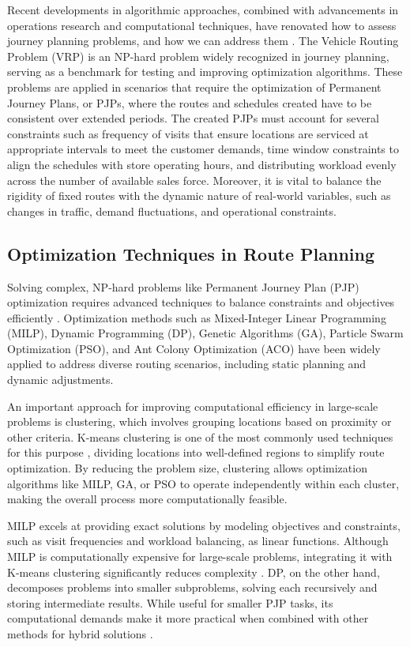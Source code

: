 Recent developments in algorithmic approaches, combined with advancements in operations research and computational techniques, have renovated how to assess journey planning problems, and how we can address them \cite{almaatani2014new}. The Vehicle Routing Problem (VRP) is an NP-hard problem widely recognized in journey planning, serving as a benchmark for testing and improving optimization algorithms. These problems are applied in scenarios that require the optimization of Permanent Journey Plans, or PJPs, where the routes and schedules created have to be consistent over extended periods. The created PJPs must account for several constraints such as frequency of visits that ensure locations are serviced at appropriate intervals to meet the customer demands, time window constraints to align the schedules with store operating hours, and distributing workload evenly across the number of available sales force. Moreover, it is vital to balance the rigidity of fixed routes with the dynamic nature of real-world variables, such as changes in traffic, demand fluctuations, and operational constraints.

\subsection{Optimization Techniques in Route Planning
}

Solving complex, NP-hard problems like Permanent Journey Plan (PJP) optimization requires advanced techniques to balance constraints and objectives efficiently \cite{Alam_Sulaiman_2022}. Optimization methods such as Mixed-Integer Linear Programming (MILP), Dynamic Programming (DP), Genetic Algorithms (GA), Particle Swarm Optimization (PSO), and Ant Colony Optimization (ACO) have been widely applied to address diverse routing scenarios, including static planning and dynamic adjustments.

An important approach for improving computational efficiency in large-scale problems is clustering, which involves grouping locations based on proximity or other criteria. K-means clustering is one of the most commonly used techniques for this purpose \cite{Alam_Sulaiman_2022}, dividing locations into well-defined regions to simplify route optimization. By reducing the problem size, clustering allows optimization algorithms like MILP, GA, or PSO to operate independently within each cluster, making the overall process more computationally feasible.

MILP excels at providing exact solutions by modeling objectives and constraints, such as visit frequencies and workload balancing, as linear functions. Although MILP is computationally expensive for large-scale problems, integrating it with K-means clustering significantly reduces complexity \cite{Laporte2017}.
DP, on the other hand, decomposes problems into smaller subproblems, solving each recursively and storing intermediate results. While useful for smaller PJP tasks, its computational demands make it more practical when combined with other methods for hybrid solutions \cite{feidiao_yang__2018}.

